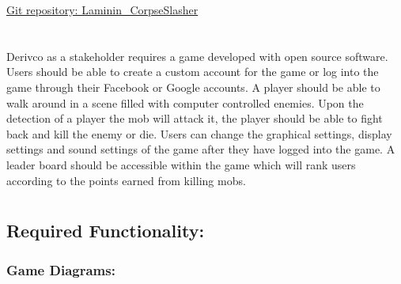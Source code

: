 \documentclass[letterpaper]{article}
\begin{document}
	\newpage
		\renewcommand\contentsname{TABLE OF CONTENTS}
		\newcommand\contentsnameLC{\colorbox{black}{\makebox[\textwidth-2\fboxsep][l]{\bfseries\color{red} Table of Contents}}}
		
		\renewcommand{\cftdot}{}
		\hypersetup{linktocpage}
		\tableofcontents
		
		\begin{flushleft}
			\LARGE\href{https://github.com/njTaljaard/Laminin_CorpseSlasher/}{Git repository: Laminin\_CorpseSlasher}
		\end{flushleft}
		
	\newpage
		
		\section*{\colorbox{black}{}} 
		\vspace{0.1in}
			
			Derivco as a stakeholder requires a game developed with open source software. Users should be able to create a custom account for the game or log into the game through their Facebook or Google accounts. A player should be able to walk around in a scene filled with computer controlled enemies. Upon the detection of a player the mob will attack it, the player should be able to fight back and kill the enemy or die. Users can change the graphical settings, display settings and sound settings of the game after they have logged into the game. A leader board should be accessible within the game which will rank users according to the points earned from killing mobs.
			
		\section*{\colorbox{black}{}} 
		\vspace{0.1in}
		
			\subsection*{Required Functionality:}
			\vspace{0.1in}
			
				\subsubsection*{Game Diagrams:}
				\vspace{0.2in}
				
\end{document}
